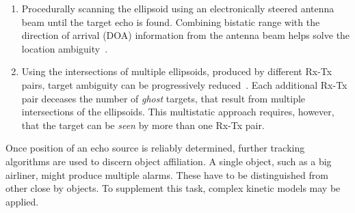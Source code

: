 \begin{enumerate}
    \item Procedurally scanning the ellipsoid using an electronically steered antenna beam until the target echo is found. Combining bistatic range with the direction of arrival (DOA) information from the antenna beam helps solve the location ambiguity~\cite[p.~132]{Griffiths2017}.
    \item Using the intersections of multiple ellipsoids, produced by different Rx-Tx pairs, target ambiguity can be progressively reduced~\cite[pp.~133-134]{Griffiths2017}. Each additional Rx-Tx pair deceases the number of \emph{ghost} targets, that result from multiple intersections of the ellipsoids. This multistatic approach requires, however, that the target can be \emph{seen} by more than one Rx-Tx pair.
\end{enumerate}

Once position of an echo source is reliably determined, further tracking algorithms are used to discern object affiliation. A single object, such as a big airliner, might produce multiple alarms. These have to be distinguished from other close by objects. To supplement this task, complex kinetic models may be applied.
